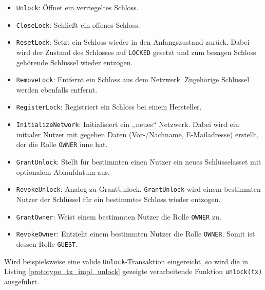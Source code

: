             \begin{itemize}
                \item \colorbox{light-gray}{\lstinline{Unlock}}: Öffnet ein verriegeltes Schloss.
                \item \colorbox{light-gray}{\lstinline{CloseLock}}: Schließt ein offenes Schloss.
                \item \colorbox{light-gray}{\lstinline{ResetLock}}: Setzt ein Schloss wieder in den Anfangszustand zurück.
                    Dabei wird der Zustand des Schlosses auf \colorbox{light-gray}{\lstinline{LOCKED}} gesetzt und zum besagen Schloss gehörende Schlüssel wieder entzogen.
                \item \colorbox{light-gray}{\lstinline{RemoveLock}}: Entfernt ein Schloss aus dem Netzwerk.
                    Zugehörige Schlüssel werden ebenfalls entfernt.
                \item \colorbox{light-gray}{\lstinline{RegisterLock}}: Registriert ein Schloss bei einem Hersteller. 
                \item \colorbox{light-gray}{\lstinline{InitializeNetwork}}: Initialisiert ein ,,neues`` Netzwerk.
                    Dabei wird ein initialer Nutzer mit gegeben Daten (Vor-/Nachname, E-Mailadresse) erstellt, der die Rolle \colorbox{light-gray}{\lstinline{OWNER}} inne hat.
                \item \colorbox{light-gray}{\lstinline{GrantUnlock}}: Stellt für bestimmten einen Nutzer ein neues Schlüsselasset mit optionalem Ablaufdatum aus. 
                \item \colorbox{light-gray}{\lstinline{RevokeUnlock}}: Analog zu GrantUnlock. \colorbox{light-gray}{\lstinline{GrantUnlock}} wird einem bestimmten Nutzer der Schlüssel für ein bestimmtes Schloss wieder entzogen.
                \item \colorbox{light-gray}{\lstinline{GrantOwner}}: Weist einem bestimmten Nutzer die Rolle \colorbox{light-gray}{\lstinline{OWNER}} zu.
                \item \colorbox{light-gray}{\lstinline{RevokeOwner}}: Entzieht einem bestimmten Nutzer die Rolle \colorbox{light-gray}{\lstinline{OWNER}}.
                Somit ist dessen Rolle \colorbox{light-gray}{\lstinline{GUEST}}.
            \end{itemize}
            Wird beispielsweise eine valide \colorbox{light-gray}{\lstinline{Unlock}}-Transaktion eingereicht, so wird die in Listing \ref{prototype_tx_impl_unlock} gezeigte verarbeitende Funktion \colorbox{light-gray}{\lstinline{unlock(tx)}} ausgeführt. 
